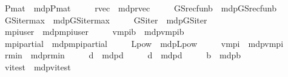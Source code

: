 \begin{isabellebody}
\ \ \ \ \ P{\isacharunderscore}{\kern0pt}mat\ {\isacharequal}{\kern0pt}\ mdp{\isachardot}{\kern0pt}P{\isacharunderscore}{\kern0pt}mat\isanewline
\ \ \ \ \ r{\isacharunderscore}{\kern0pt}vec{\isacharprime}{\kern0pt}\ {\isacharequal}{\kern0pt}\ mdp{\isachardot}{\kern0pt}r{\isacharunderscore}{\kern0pt}vec{\isacharprime}{\kern0pt}\isanewline
\ \ \ \ \ GS{\isacharunderscore}{\kern0pt}rec{\isacharunderscore}{\kern0pt}fun\isactrlsub b\ {\isacharequal}{\kern0pt}\ mdp{\isachardot}{\kern0pt}GS{\isacharunderscore}{\kern0pt}rec{\isacharunderscore}{\kern0pt}fun\isactrlsub b\isanewline
\ \ \ \ \ GS{\isacharunderscore}{\kern0pt}iter{\isacharunderscore}{\kern0pt}max\ {\isacharequal}{\kern0pt}\ mdp{\isachardot}{\kern0pt}GS{\isacharunderscore}{\kern0pt}iter{\isacharunderscore}{\kern0pt}max\isanewline
\ \ \ \ \ GS{\isacharunderscore}{\kern0pt}iter\ {\isacharequal}{\kern0pt}\ mdp{\isachardot}{\kern0pt}GS{\isacharunderscore}{\kern0pt}iter\isanewline
\ \ \ \ \ mpi{\isacharunderscore}{\kern0pt}user\ {\isacharequal}{\kern0pt}\ mdp{\isachardot}{\kern0pt}mpi{\isacharunderscore}{\kern0pt}user\isanewline
\ \ \ \ \ v{}{\isacharunderscore}{\kern0pt}mpi\isactrlsub b\ {\isacharequal}{\kern0pt}\ mdp{\isachardot}{\kern0pt}v{}{\isacharunderscore}{\kern0pt}mpi\isactrlsub b\isanewline
\ \ \ \ \ mpi{\isacharunderscore}{\kern0pt}partial{\isacharprime}{\kern0pt}\ {\isacharequal}{\kern0pt}\ mdp{\isachardot}{\kern0pt}mpi{\isacharunderscore}{\kern0pt}partial{\isacharprime}{\kern0pt}\isanewline
\ \ \ \ \ L{\isacharunderscore}{\kern0pt}pow\ {\isacharequal}{\kern0pt}\ mdp{\isachardot}{\kern0pt}L{\isacharunderscore}{\kern0pt}pow\isanewline
\ \ \ \ \ v{}{\isacharunderscore}{\kern0pt}mpi\ {\isacharequal}{\kern0pt}\ mdp{\isachardot}{\kern0pt}v{}{\isacharunderscore}{\kern0pt}mpi\isanewline
\ \ \ \ \ r{\isacharunderscore}{\kern0pt}min\ {\isacharequal}{\kern0pt}\ mdp{\isachardot}{\kern0pt}r{\isacharunderscore}{\kern0pt}min\isanewline
\ \ \ \ \ d{}\ {\isacharequal}{\kern0pt}\ mdp{\isachardot}{\kern0pt}d{}\isanewline
\ \ \ \ \ d{}{\isacharprime}{\kern0pt}\ {\isacharequal}{\kern0pt}\ mdp{\isachardot}{\kern0pt}d{}{\isacharprime}{\kern0pt}\isanewline
\ \ \ \ \ {\isasymnu}\isactrlsub b\ {\isacharequal}{\kern0pt}\ mdp{\isachardot}{\kern0pt}{\isasymnu}\isactrlsub b\isanewline
\ \ \ \ \ vi{\isacharunderscore}{\kern0pt}test\ {\isacharequal}{\kern0pt}\ mdp{\isachardot}{\kern0pt}vi{\isacharunderscore}{\kern0pt}test\isanewline

\end{isabellebody}
